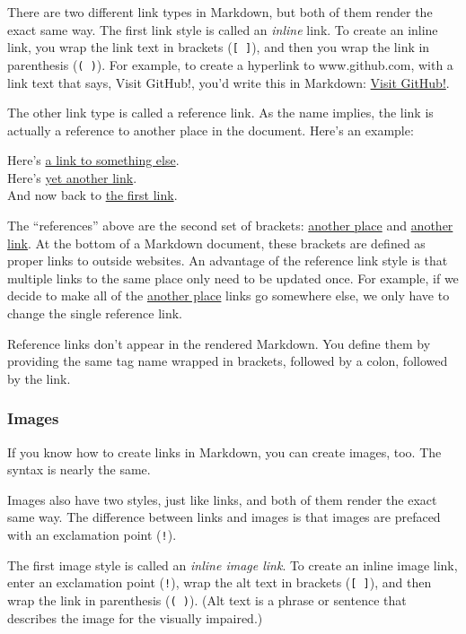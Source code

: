 \documentclass[
]{article}
\begin{document}
There are two different link types in Markdown, but both of them render
the exact same way. The first link style is called an \emph{inline}
link. To create an inline link, you wrap the link text in brackets
(\texttt{{[}\ {]}}), and then you wrap the link in parenthesis
(\texttt{(\ )}). For example, to create a hyperlink to www.github.com,
with a link text that says, Visit GitHub!, you'd write this in Markdown:
\href{https://github.com/}{Visit GitHub!}.

The other link type is called a reference link. As the name implies, the
link is actually a reference to another place in the document. Here's an
example:

Here's \href{https://github.com/}{a link to something else}.\\
Here's \href{https://www.google.com/}{yet another link}.\\
And now back to \href{https://github.com/}{the first link}.

The ``references'' above are the second set of brackets:
\href{https://github.com/}{another place} and
\href{https://www.google.com/}{another link}. At the bottom of a
Markdown document, these brackets are defined as proper links to outside
websites. An advantage of the reference link style is that multiple
links to the same place only need to be updated once. For example, if we
decide to make all of the \href{https://github.com/}{another place}
links go somewhere else, we only have to change the single reference
link.

Reference links don't appear in the rendered Markdown. You define them
by providing the same tag name wrapped in brackets, followed by a colon,
followed by the link.

\hypertarget{images}{%
\subsubsection{Images}\label{images}}

If you know how to create links in Markdown, you can create images, too.
The syntax is nearly the same.

Images also have two styles, just like links, and both of them render
the exact same way. The difference between links and images is that
images are prefaced with an exclamation point (\texttt{!}).

The first image style is called an \emph{inline image link}. To create
an inline image link, enter an exclamation point (\texttt{!}), wrap the
alt text in brackets (\texttt{{[}\ {]}}), and then wrap the link in
parenthesis (\texttt{(\ )}). (Alt text is a phrase or sentence that
describes the image for the visually impaired.)
\end{document}
